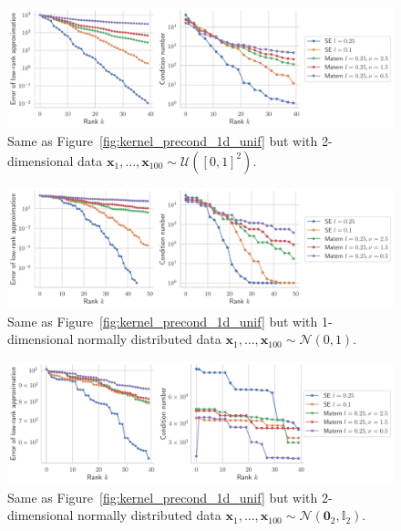 \documentclass{article}
\newcommand{\vect}[1]{\boldsymbol{\mathbf{#1}}}
\begin{document}
\begin{figure}[h!]
    \centering
    \includegraphics[width=0.9\linewidth]{report/res/kernel_preconditionning_2d_uniform.pdf}
    \caption{Same as Figure~\ref{fig:kernel_precond_1d_unif} but with 2-dimensional data $\vect x_1, \ldots, \vect x_{100} \sim \mathcal U([0, 1]^2)$.}
    \label{fig:kernel_precond_2d_unif}
\end{figure}


\begin{figure}[h!]
    \centering
    \includegraphics[width=0.9\linewidth]{report/res/kernel_preconditionning_1d_stdnormal.pdf}
    \caption{Same as Figure~\ref{fig:kernel_precond_1d_unif} but with 1-dimensional normally distributed data $\vect x_1, \ldots, \vect x_{100} \sim \mathcal N(0, 1)$.}
    \label{fig:kernel_precond_1d_stdnormal}
\end{figure}


\begin{figure}[h!]
    \centering
    \includegraphics[width=0.9\linewidth]{report/res/kernel_preconditionning_2d_stdnormal.pdf}
    \caption{Same as Figure~\ref{fig:kernel_precond_1d_unif} but with 2-dimensional normally distributed data $\vect x_1, \ldots, \vect x_{100} \sim \mathcal N(\vect 0_2, \mathbb I_2)$.}
    \label{fig:kernel_precond_2d_stdnormal}
\end{figure}
\end{document}
